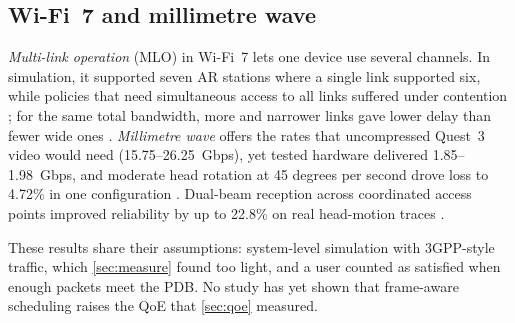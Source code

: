 \subsection{Wi-Fi~7 and millimetre wave}
\emph{Multi-link operation} (MLO) in Wi-Fi~7 lets one device use several channels. In simulation, it
supported seven AR stations where a single link supported six, while policies that need simultaneous
access to all links suffered under contention \cite{W4376480829}; for the same total bandwidth, more and
narrower links gave lower delay than fewer wide ones \cite{W4412836976}. \emph{Millimetre wave} offers the
rates that uncompressed Quest~3 video would need (15.75--26.25~Gbps), yet tested hardware delivered
1.85--1.98~Gbps, and moderate head rotation at 45 degrees per second drove loss to 4.72\% in one
configuration \cite{W4401507876}. Dual-beam reception across coordinated access points improved reliability by up to 22.8\% on real head-motion traces \cite{W4409076649}.

These results share their assumptions: system-level simulation with 3GPP-style traffic, which
\cref{sec:measure} found too light, and a user counted as satisfied when enough packets meet the PDB. No
study has yet shown that frame-aware scheduling raises the QoE that \cref{sec:qoe} measured.
